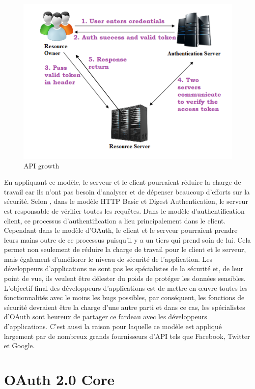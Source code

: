 \begin{figure}[! ht ]
			\centering
			\includegraphics[scale=.4]{./images/api_oauth_steps.png}
			\caption {API growth}
		\end{figure}
En appliquant ce modèle, le serveur et le client pourraient réduire la charge de travail car ils n'ont pas besoin d'analyser et de dépenser beaucoup d'efforts sur la sécurité. Selon \cite{16}, dans le modèle HTTP Basic et Digest Authentication, le serveur est responsable de vérifier toutes les requêtes. Dans le modèle d'authentification client, ce processus d'authentification a lieu principalement dans le client. Cependant dans le modèle d'OAuth, le client et le serveur pourraient prendre leurs mains outre de ce processus puisqu'il y a un tiers qui prend soin de lui. Cela permet non seulement de réduire la charge de travail pour le client et le serveur, mais également d'améliorer le niveau de sécurité de l'application. Les développeurs d'applications ne sont pas les spécialistes de la sécurité et, de leur point de vue, ils veulent être délester du poids de protéger les données sensibles. L'objectif final des développeurs d'applications est de mettre en œuvre toutes les fonctionnalités avec le moins les bugs possibles, par conséquent, les fonctions de sécurité devraient être la charge d'une autre parti et dans ce cas, les spécialistes d'OAuth sont heureux de partager ce fardeau avec les développeurs d'applications. C'est aussi la raison pour laquelle ce modèle est appliqué largement par de nombreux grands fournisseurs d'API tels que Facebook, Twitter et Google.

\section{OAuth 2.0 Core}


